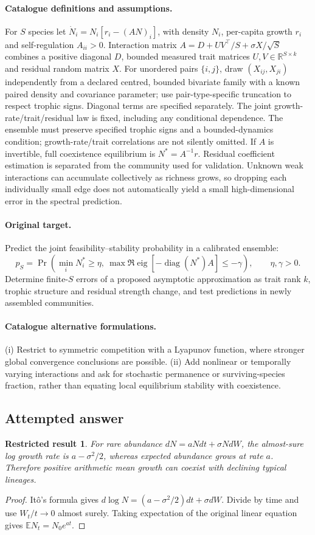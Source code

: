 \documentclass[11pt]{article}
\newcommand{\R}{\mathbb R}
\newcommand{\E}{\mathbb E}
\providecommand{\R}{\mathbb R}
\providecommand{\E}{\mathbb E}
\newtheorem{attemptresult}{Restricted result}[section]
\begin{document}
\paragraph{Catalogue definitions and assumptions.}
For $S$ species let $\dot N_i=N_i[r_i-(AN)_i]$, with density $N_i$, per-capita growth $r_i$ and self-regulation $A_{ii}>0$. Interaction matrix $A=D+UV^\top/S+\sigma X/\sqrt S$ combines a positive diagonal $D$, bounded measured trait matrices $U,V\in\R^{S\times k}$ and residual random matrix $X$. For unordered pairs $\{i,j\}$, draw $(X_{ij},X_{ji})$ independently from a declared centred, bounded bivariate family with a known paired density and covariance parameter; use pair-type-specific truncation to respect trophic signs. Diagonal terms are specified separately. The joint growth-rate/trait/residual law is fixed, including any conditional dependence. The ensemble must preserve specified trophic signs and a bounded-dynamics condition; growth-rate/trait correlations are not silently omitted. If $A$ is invertible, full coexistence equilibrium is $N^*=A^{-1}r$. Residual coefficient estimation is separated from the community used for validation. Unknown weak interactions can accumulate collectively as richness grows, so dropping each individually small edge does not automatically yield a small high-dimensional error in the spectral prediction.
\paragraph{Original target.}
Predict the joint feasibility--stability probability in a calibrated ensemble:
\[
 p_S=\Pr\!\left(\min_iN_i^*\ge\eta,
 \ \max\Re\operatorname{eig}[-\operatorname{diag}(N^*)A]\le-\gamma\right),
 \qquad \eta,\gamma>0.
\]
Determine finite-$S$ errors of a proposed asymptotic approximation as trait rank $k$, trophic structure and residual strength change, and test predictions in newly assembled communities.
\paragraph{Catalogue alternative formulations.}
(i) Restrict to symmetric competition with a Lyapunov function, where stronger global convergence conclusions are possible. (ii) Add nonlinear or temporally varying interactions and ask for stochastic permanence or surviving-species fraction, rather than equating local equilibrium stability with coexistence.
\subsection{Attempted answer}
\begin{attemptresult}
For rare abundance $dN=aNdt+\sigma N dW$, the almost-sure log growth rate is $a-\sigma^2/2$, whereas expected abundance grows at rate $a$. Therefore positive arithmetic mean growth can coexist with declining typical lineages.
\end{attemptresult}
\begin{proof}
It\^o's formula gives $d\log N=(a-\sigma^2/2)dt+\sigma dW$. Divide by time and use $W_t/t\to0$ almost surely. Taking expectation of the original linear equation gives $\E N_t=N_0e^{at}$.
\end{proof}
\end{document}
